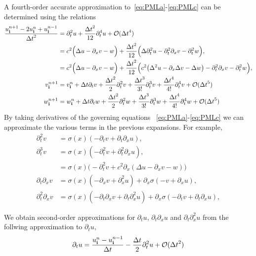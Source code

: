 \documentclass{article}
\begin{document}
A fourth-order accurate approximation to~\eqref{eq:PMLa}-\eqref{eq:PMLc} can be determined using the relations
\begin{align}
  {u_{\mathbf{ i}}^{n+1} - 2 u_{\mathbf{ i}}^n + u_{\mathbf{ i}}^{n-1} \over {\Delta t}^2} &= \partial_t^2 u + \frac{{\Delta t}^2}{12} \partial_t^4 u + {\mathcal O}({\Delta t}^4) \label{eq:PMLorder4a} \\
   &= c^2 \Big( \Delta u - \partial_x v - w \Big)
    + \frac{{\Delta t}^2}{12}\Big( \Delta \partial_t^2 u - \partial_t^2\partial_x v - \partial_t^2 w \Big), \\
   &= c^2 \Big( \Delta u - \partial_x v - w \Big)
    + \frac{{\Delta t}^2}{12}\Big( c^2 \big( \Delta^2 u  -\partial_x\Delta v - \Delta w\big)  - \partial_t^2\partial_x v - \partial_t^2 w \Big), \\
  v_{\mathbf{ i}}^{n+1} &= v_{\mathbf{ i}}^n + {\Delta t}\partial_t v + \frac{{\Delta t}^2}{2} \partial_t^2 v + \frac{{\Delta t}^3}{3!} \partial_t^3 v  
                     + \frac{{\Delta t}^4}{4!} \partial_t^4 v + {\mathcal O}({\Delta t}^5) \\
  w_{\mathbf{ i}}^{n+1} &= w_{\mathbf{ i}}^n + {\Delta t}\partial_t w + \frac{{\Delta t}^2}{2} \partial_t^2 w + \frac{{\Delta t}^3}{3!} \partial_t^3 w  
                     + \frac{{\Delta t}^4}{4!} \partial_t^4 w + {\mathcal O}({\Delta t}^5)  \label{eq:PMLorder4e}
\end{align}
By taking derivatives of the governing equations ~\eqref{eq:PMLa}-\eqref{eq:PMLc} we can approximate the various
terms in the previous expansions. For example, 
\begin{align}
     \partial_t^2 v &= \sigma(x)( -\partial_t v + \partial_t\partial_x u ) , \\
     \partial_t^3 v &= \sigma(x)( -\partial_t^2 v + \partial_t^2\partial_x u ) , \\
                   &= \sigma(x)\Big( -\partial_t^2 v + c^2 \partial_x (  \Delta u - \partial_x v - w )  \Big) \\
     \partial_t\partial_x v &= \sigma(x)( -\partial_x v + \partial_x^2 u ) + \partial_x\sigma ( - v + \partial_x u ) , \\
     \partial_t^2\partial_x v &= \sigma(x)( -\partial_t\partial_x v + \partial_t\partial_x^2 u )
                                  + \partial_x\sigma ( - \partial_tv + \partial_t\partial_x u ) ,
\end{align}


We obtain second-order approximations for $\partial_t u$, $\partial_t\partial_x u$ and $\partial_t\partial_x^2 u$ from
the follwing approximation to $\partial_t u$, 
\begin{align}
 \partial_t u &= { u_{\mathbf{ i}}^n - u_{\mathbf{ i}}^{n-1} \over {\Delta t}} - \frac{{\Delta t}}{2} \partial_t^2 u + {\mathcal O}({\Delta t}^2) \\
\end{align}
\end{document}
